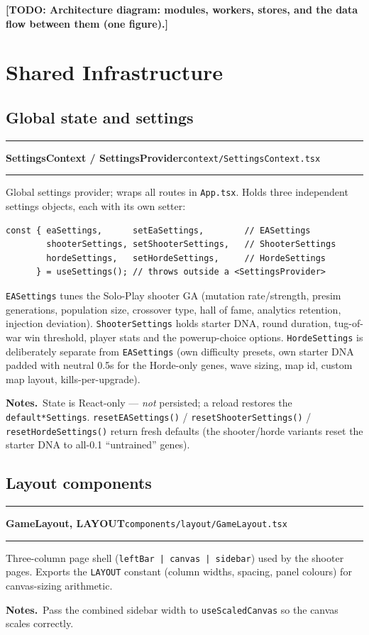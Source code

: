 \documentclass[11pt,a4paper]{report}
\newcommand{\todo}[1]{\textcolor{red!70!black}{\textbf{[TODO: #1]}}}
\newcommand{\srcfile}[1]{\texttt{\small #1}}   %
\newcommand{\ts}[1]{\texttt{#1}}               %
\newenvironment{apientry}[2]{%
  \par\medskip\noindent
  \begin{minipage}{\textwidth}
  \hrule\vspace{0.6ex}
  {\large\ttfamily\bfseries #1}\hfill{\footnotesize\srcfile{#2}}
  \vspace{0.4ex}\hrule\medskip
}{%
  \end{minipage}\par\medskip
}
\newcommand{\apifield}[1]{\par\smallskip\noindent\textbf{#1.}\ }
\begin{document}
\todo{Architecture diagram: modules, workers, stores, and the data flow
between them (one figure).}

\chapter{Shared Infrastructure}
\label{ch:api-shared}

\section{Global state and settings}

\begin{apientry}{SettingsContext / SettingsProvider}{context/SettingsContext.tsx}
Global settings provider; wraps all routes in \srcfile{App.tsx}. Holds
three independent settings objects, each with its own setter:
\begin{lstlisting}
const { eaSettings,      setEaSettings,        // EASettings
        shooterSettings, setShooterSettings,   // ShooterSettings
        hordeSettings,   setHordeSettings,     // HordeSettings
      } = useSettings(); // throws outside a <SettingsProvider>
\end{lstlisting}
\ts{EASettings} tunes the Solo-Play shooter GA (mutation rate/strength,
presim generations, population size, crossover type, hall of fame,
analytics retention, injection deviation). \ts{ShooterSettings} holds
starter DNA, round duration, tug-of-war win threshold, player stats and
the powerup-choice options. \ts{HordeSettings} is deliberately separate
from \ts{EASettings} (own difficulty presets, own starter DNA padded with
neutral 0.5s for the Horde-only genes, wave sizing, map id, custom map
layout, kills-per-upgrade).
\apifield{Notes}State is React-only --- \emph{not} persisted; a reload
restores the \ts{default*Settings}. \ts{resetEASettings()} /
\ts{resetShooterSettings()} / \ts{resetHordeSettings()} return fresh
defaults (the shooter/horde variants reset the starter DNA to all-0.1
``untrained'' genes).
\end{apientry}

\section{Layout components}

\begin{apientry}{GameLayout, LAYOUT}{components/layout/GameLayout.tsx}
Three-column page shell (\ts{leftBar | canvas | sidebar}) used by the
shooter pages. Exports the \ts{LAYOUT} constant (column widths, spacing,
panel colours) for canvas-sizing arithmetic.
\apifield{Notes}Pass the combined sidebar width to \ts{useScaledCanvas}
so the canvas scales correctly.
\end{apientry}
\end{document}
